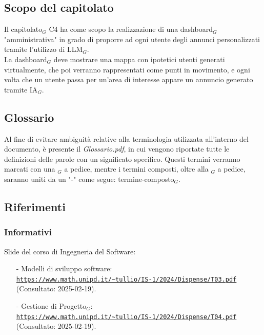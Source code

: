 \documentclass[10pt]{article}
\begin{document}
\subsection{Scopo del capitolato}
Il capitolato$_G$ C4 ha come scopo la realizzazione di una dashboard$_G$ "amministrativa" in grado di proporre ad ogni utente degli annunci personalizzati tramite l'utilizzo di LLM$_G$.\\ 
La dashboard$_G$ deve mostrare una mappa con ipotetici utenti generati virtualmente, che poi verranno rappresentati come punti in movimento, e ogni volta che un utente passa per un'area di interesse appare un annuncio generato tramite IA$_G$.

\subsection{Glossario}
Al fine di evitare ambiguità relative alla terminologia utilizzata all'interno del documento, è presente il \textit{Glossario.pdf}, in cui vengono riportate tutte le definizioni delle parole con un significato specifico. Questi termini verranno marcati con una $_G$ a pedice, mentre i termini composti, oltre alla $_G$ a pedice, saranno uniti da un "-" come segue: termine-composto$_G$. 

\subsection{Riferimenti}
\subsubsection{Informativi}
Slide del corso di Ingegneria del Software:
\begin{itemize}
\item [-] Modelli di sviluppo software:\\ \textcolor{blue}{\texttt{\url{https://www.math.unipd.it/~tullio/IS-1/2024/Dispense/T03.pdf}}}\\
(Consultato: 2025-02-19).
\item [-] Gestione di Progetto$_G$:\\ \textcolor{blue}{\texttt{\url{https://www.math.unipd.it/~tullio/IS-1/2024/Dispense/T04.pdf}}}\\
(Consultato: 2025-02-19).
\end{itemize}
\end{document}
